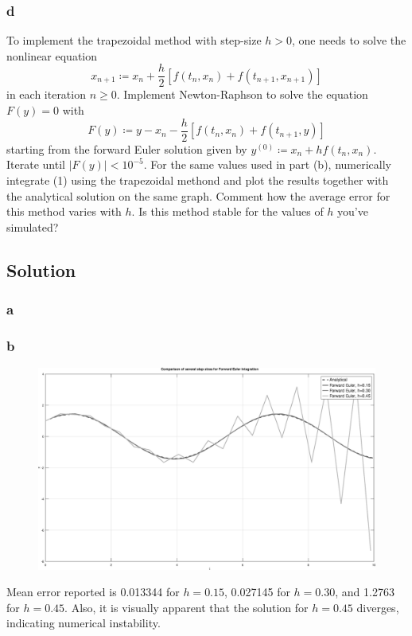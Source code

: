 \documentclass[11pt]{report}
\theoremstyle{definition}
\begin{document}
\subsubsection*{d}
To implement the trapezoidal method with step-size $h>0$, one needs to solve the
nonlinear equation
\[x_{n+1}\coloneqq x_n + \frac{h}{2}[f(t_n,x_n)+f(t_{n+1},x_{n+1})]\]
in each iteration $n\geq 0$. Implement Newton-Raphson to solve the equation $F(y)=0$ with
\[ F(y)\coloneqq y-x_n-\frac{h}{2}[f(t_n,x_n)+f(t_{n+1},y)] \]
starting from the forward Euler solution given by $y^{(0)}\coloneqq x_n+hf(t_n,x_n)$.
Iterate until $|F(y)|<10^{-5}$. For the same values used in part (b), numerically
integrate (1) using the trapezoidal methond and plot the results together with the
analytical solution on the same graph. Comment how the average error for this method
varies with $h$. Is this method stable for the values of $h$ you've simulated?

\subsection*{Solution}
\subsubsection*{a}
\subsubsection*{b}
\begin{figure}[h]
	\includegraphics[width=\textwidth]{forward_euler}
\end{figure}
Mean error reported is 0.013344 for $h=0.15$, 0.027145 for $h=0.30$, and 1.2763
for $h=0.45$. Also, it is visually apparent that the solution for $h=0.45$
diverges, indicating numerical instability.
\end{document}
